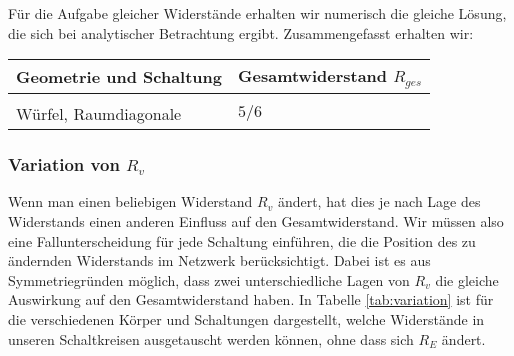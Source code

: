 \documentclass[10pt,a4paper]{article}
\begin{document}
Für die Aufgabe gleicher Widerstände erhalten wir numerisch die gleiche Lösung, die sich bei analytischer Betrachtung ergibt. Zusammengefasst erhalten wir:
\begin{table}[htbp!]
\centering
\begin{tabular}{l|l}
Geometrie und Schaltung & Gesamtwiderstand $R_{ges}$\\\hline
\\
Würfel, Raumdiagonale & $5/6$
\end{tabular}
\end{table}

\subsubsection{Variation von $R_v$}
\label{sec:variation}
Wenn man einen beliebigen Widerstand $R_v$ ändert, hat dies je nach Lage des Widerstands einen anderen Einfluss auf den Gesamtwiderstand. Wir müssen also eine Fallunterscheidung für jede Schaltung einführen, die die Position des zu ändernden Widerstands im Netzwerk berücksichtigt. Dabei ist es aus Symmetriegründen möglich, dass zwei unterschiedliche Lagen von $R_v$ die gleiche Auswirkung auf den Gesamtwiderstand haben. In Tabelle \ref{tab:variation} ist für die verschiedenen Körper und Schaltungen dargestellt, welche Widerstände in unseren Schaltkreisen ausgetauscht werden können, ohne dass sich $R_E$ ändert.
\end{document}
